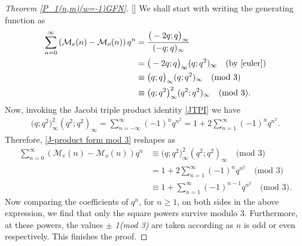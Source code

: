 \documentclass[12pt,reqno]{amsart}
\renewcommand{\(}{\left\(}
\renewcommand{\)}{\right\)}
\renewcommand{\[}{\left\[}
\renewcommand{\]}{\right\]}
\numberwithin{equation}{section}
\theoremstyle{plain}
\begin{document}
\begin{proof}[Theorem \textup{\ref{P_1(n,m)(w=-1)GFN}}][]
We shall start with writing the generating function as
\begin{align}
\sum_{n=0}^{\infty}\left(\mathcal{M}_e(n)-\mathcal{M}_o(n)\right)q^n&=\frac{\big(-2q;q\big)_{\infty}}{(-q;q)_{\infty}}\nonumber\\&=\big(-2q;q\big)_{\infty}(q;q^2)_{\infty} \quad \text{(by \eqref{euler})}\nonumber\\
&\equiv \big(q;q\big)_{\infty}(q;q^2)_{\infty} \quad\text{(mod 3)}\nonumber\\
&\equiv \big(q;q^2\big)^2_{\infty}(q^2;q^2)_{\infty} \quad\text{(mod 3)}.\label{J-product form mod 3}
\end{align}
Now, invoking the Jacobi triple product identity \eqref{JTPI} we have
\begin{align*}
\big(q;q^2\big)^2_{\infty}(q^2;q^2)_{\infty}=\sum_{n=-\infty}^{\infty}(-1)^n q^{n^2}=1+2\sum_{n=1}^{\infty}(-1)^n q^{n^2}.
\end{align*}
Therefore, \eqref{J-product form mod 3} reshapes as
\begin{align*}
\sum_{n=0}^{\infty}\left(\mathcal{M}_e(n)-\mathcal{M}_o(n)\right)q^n&\equiv \big(q;q^2\big)^2_{\infty}(q^2;q^2)_{\infty} \quad\text{(mod 3)}\\ &= 1+2\sum_{n=1}^{\infty}(-1)^n q^{n^2}\quad\text{(mod 3)}\\ & \equiv 1+\sum_{n=1}^{\infty}(-1)^{n-1} q^{n^2}\quad\text{(mod 3)}.
\end{align*}
Now comparing the coefficients of $q^n$, for $n\geq 1$, on both sides in the above expression, we find that only the square powers survive modulo 3. Furthermore, at these powers, the values $\pm$ \emph{1(mod 3)} are taken according as $n$ is odd or even respectively. This finishes the proof.
\end{proof}
\end{document}

